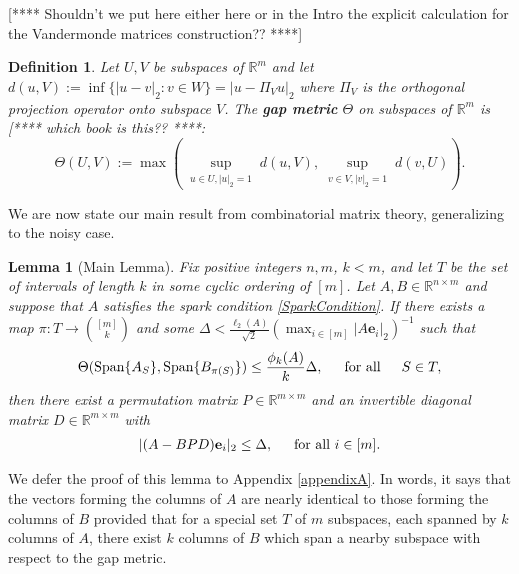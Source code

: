 \documentclass[journal, onecolumn]{IEEEtran}
\newtheorem{lemma}{Lemma}
\newtheorem{definition}{Definition}
\begin{document}
[**** Shouldn't we put here either here or in the Intro the explicit calculation for the Vandermonde matrices construction?? ****]

\begin{definition}\label{GapMetricDef}
Let $U, V$ be subspaces of $\mathbb{R}^m$ and let $d(u,V) := \inf\{|u-v|_2: v \in W\} = |u - \Pi_V u|_2$ where $\Pi_V$ is the orthogonal projection operator onto subspace $V$. The \textbf{gap metric} $\Theta$ on subspaces of $\mathbb{R}^{m}$ is \cite{TheoryOfLinearOperatorsPage69} [**** which book is this?? ****:
\begin{equation}\label{SubspaceMetric}
\Theta(U,V) := \max\left( \sup_{\substack{u \in U, |u|_2 = 1}} d(u,V), \sup_{\substack{v \in V, |v|_2 = 1}} d(v,U) \right).
\end{equation}
\end{definition}

We are now state our main result from combinatorial matrix theory, generalizing \cite[Lemma 1]{Hillar15} to the noisy case.


\begin{lemma}[Main Lemma]\label{MainLemma}
Fix positive integers $n, m$, $k < m$, and let $T$ be the set of intervals of length $k$ in some cyclic ordering of $[m]$. Let $A, B \in \mathbb{R}^{n \times m}$ and suppose that $A$ satisfies the spark condition \eqref{SparkCondition}.  If there exists a map $\pi: T \to {[m] \choose k}$ and some $\Delta < \frac{\ell_{2}(A)}{\sqrt{2}} \left( \max_{i \in [m]}|A\mathbf{e}_i|_2 \right)^{-1}$ such that 
\begin{equation}\label{GapUpperBound}
\Theta(\text{Span}\{A_{S}\}, \text{Span}\{B_{\pi(S)}\}) \leq \frac{ \phi_k(A) }{k} \Delta, \indent \text{for all} \indent S \in T,
\end{equation}
%
then there exist a permutation matrix $P \in \mathbb{R}^{m \times m}$ and an invertible diagonal matrix $D \in \mathbb{R}^{m \times m}$ with
\begin{align}
|(A - BPD)\mathbf{e}_i|_2 \leq \Delta, \indent \text{for all } i \in [m].
\end{align}
\end{lemma}
We defer the proof of this lemma to Appendix \ref{appendixA}. In words, it says that the vectors forming the columns of $A$ are nearly identical to those forming the columns of $B$ provided that for a special set $T$ of $m$ subspaces, each spanned by $k$ columns of $A$, there exist $k$ columns of $B$ which span a nearby subspace with respect to the gap metric.
\end{document}
